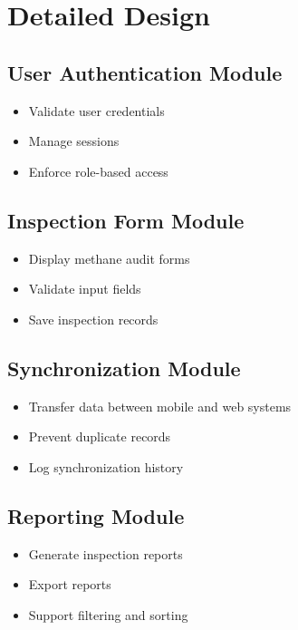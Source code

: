 \documentclass[12pt]{article}
\begin{document}
\section{Detailed Design}

\subsection{User Authentication Module}

\begin{itemize}
\item Validate user credentials
\item Manage sessions
\item Enforce role-based access
\end{itemize}

\subsection{Inspection Form Module}

\begin{itemize}
\item Display methane audit forms
\item Validate input fields
\item Save inspection records
\end{itemize}

\subsection{Synchronization Module}

\begin{itemize}
\item Transfer data between mobile and web systems
\item Prevent duplicate records
\item Log synchronization history
\end{itemize}

\subsection{Reporting Module}

\begin{itemize}
\item Generate inspection reports
\item Export reports
\item Support filtering and sorting
\end{itemize}
\end{document}
